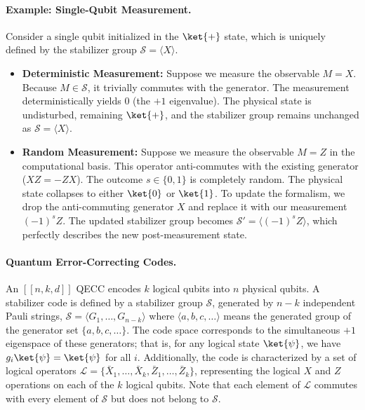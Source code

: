 \documentclass[acmsmallw,review]{acmart}
\begin{document}
\paragraph{\textbf{Example: Single-Qubit Measurement.}}
Consider a single qubit initialized in the $\ket{+}$ state, which is uniquely defined by the stabilizer group $\mathcal{S} = \langle X \rangle$.
\begin{itemize}
    \item \textbf{Deterministic Measurement:} Suppose we measure the observable $M = X$. Because $M \in \mathcal{S}$, it trivially commutes with the generator. The measurement deterministically yields $0$ (the $+1$ eigenvalue). The physical state is undisturbed, remaining $\ket{+}$, and the stabilizer group remains unchanged as $\mathcal{S} = \langle X \rangle$.
    
    \item \textbf{Random Measurement:} Suppose we measure the observable $M = Z$ in the computational basis. This operator anti-commutes with the existing generator ($XZ = -ZX$). The outcome $s \in \{0,1\}$ is completely random. The physical state collapses to either $\ket{0}$ or $\ket{1}$. To update the formalism, we drop the anti-commuting generator $X$ and replace it with our measurement $(-1)^s Z$. The updated stabilizer group becomes $\mathcal{S}' = \langle (-1)^s Z \rangle$, which perfectly describes the new post-measurement state.
\end{itemize}


\paragraph{\textbf{Quantum Error-Correcting Codes.}}
An $[[n,k,d]]$ QECC encodes $k$ logical qubits into $n$ physical qubits. A stabilizer code is defined by a stabilizer group $\mathcal{S}$, generated by $n-k$ independent Pauli strings, $\mathcal{S} = \langle G_1, \dots, G_{n-k} \rangle$ where $\langle  a,b,c, \dots \rangle $ means the generated group of the generator set $\{a,b,c, \dots \}$. The code space corresponds to the simultaneous $+1$ eigenspace of these generators; that is, for any logical state $\ket{\psi}$, we have $g_i \ket{\psi} = \ket{\psi}$ for all $i$. Additionally, the code is characterized by a set of logical operators $\mathcal{L} = \{\bar{X}_1, \dots, \bar{X}_k, \bar{Z}_1, \dots, \bar{Z}_k\}$, representing the logical $X$ and $Z$ operations on each of the $k$ logical qubits. Note that each element of $\mathcal{L}$ commutes with every element of $\mathcal{S}$ but does not belong to $\mathcal{S}$.
\end{document}
